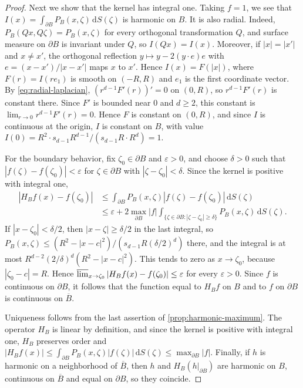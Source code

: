 \begin{proof}
Next we show that the kernel has integral one. Taking $f=1$, we see that $I(x)=\int_{\partial B}P_B(x,\zeta)\,\mathrm dS(\zeta)$ is harmonic on $B$. It is also radial. Indeed, $P_B(Qx,Q\zeta)=P_B(x,\zeta)$ for every orthogonal transformation $Q$, and surface measure on $\partial B$ is invariant under $Q$, so $I(Qx)=I(x)$. Moreover, if $|x|=|x'|$ and $x\neq x'$, the orthogonal reflection $y\mapsto y-2(y\cdot e)e$ with $e=(x-x')/|x-x'|$ maps $x$ to $x'$. Hence $I(x)=F(|x|)$, where $F(r)=I(re_1)$ is smooth on $(-R,R)$ and $e_1$ is the first coordinate vector. By \eqref{eq:radial-laplacian}, $(r^{d-1}F'(r))'=0$ on $(0,R)$, so $r^{d-1}F'(r)$ is constant there. Since $F'$ is bounded near $0$ and $d\geq2$, this constant is $\lim_{r\to0}r^{d-1}F'(r)=0$. Hence $F$ is constant on $(0,R)$, and since $I$ is continuous at the origin, $I$ is constant on $B$, with value $I(0)=R^2\cdot s_{d-1}R^{d-1}/(s_{d-1}R\cdot R^d)=1$.

For the boundary behavior, fix $\zeta_0\in\partial B$ and $\varepsilon>0$, and choose $\delta>0$ such that $|f(\zeta)-f(\zeta_0)|<\varepsilon$ for $\zeta\in\partial B$ with $|\zeta-\zeta_0|<\delta$. Since the kernel is positive with integral one,
\begin{align*}
 |H_Bf(x)-f(\zeta_0)|&\leq\int_{\partial B}P_B(x,\zeta)|f(\zeta)-f(\zeta_0)|\,\mathrm dS(\zeta)\\
 &\leq\varepsilon+2\max_{\partial B}|f|\int_{\{\zeta\in\partial B:|\zeta-\zeta_0|\geq\delta\}}P_B(x,\zeta)\,\mathrm dS(\zeta).
\end{align*}
If $|x-\zeta_0|<\delta/2$, then $|x-\zeta|\geq\delta/2$ in the last integral, so $P_B(x,\zeta)\leq(R^2-|x-c|^2)/(s_{d-1}R(\delta/2)^d)$ there, and the integral is at most $R^{d-2}(2/\delta)^d(R^2-|x-c|^2)$. This tends to zero as $x\to\zeta_0$, because $|\zeta_0-c|=R$. Hence $\varlimsup_{x\to\zeta_0}|H_Bf(x)-f(\zeta_0)|\leq\varepsilon$ for every $\varepsilon>0$. Since $f$ is continuous on $\partial B$, it follows that the function equal to $H_Bf$ on $B$ and to $f$ on $\partial B$ is continuous on $\overline B$.

Uniqueness follows from the last assertion of \cref{prop:harmonic-maximum}. The operator $H_B$ is linear by definition, and since the kernel is positive with integral one, $H_B$ preserves order and $|H_Bf(x)|\leq\int_{\partial B}P_B(x,\zeta)|f(\zeta)|\,\mathrm dS(\zeta)\leq\max_{\partial B}|f|$. Finally, if $h$ is harmonic on a neighborhood of $\overline B$, then $h$ and $H_B(h|_{\partial B})$ are harmonic on $B$, continuous on $\overline B$ and equal on $\partial B$, so they coincide.
\end{proof}

